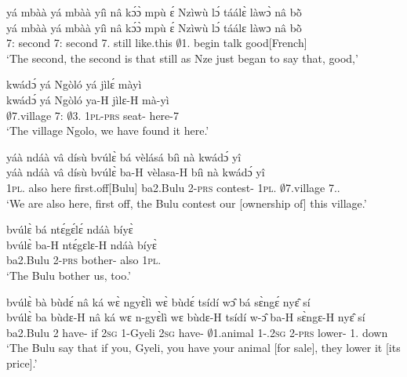 \begin{exe}[(C234)]
\exC\label{102} 
  \glll  yá mbàà yá mbàà yíì nâ kɔ́ɔ̀ mpù ɛ́ Nzìwù lɔ́ táálɛ̀ làwɔ̀ nâ bõ̀ \\
         yá mbàà yá mbàà yíì nâ kɔ́ɔ̀ mpù ɛ́ Nzìwù lɔ́ táálɛ làwɔ nâ bõ̀ \\
         7:{\ATT}  second 7:{\ATT}  second 7.{\COP} {\COMP} still like.this {\LOC} $\emptyset$1.{\PN} {\RETRO}  begin talk {\COMP} good[French]   \\
    \trans `The second, the second is that still as Nze just began to say that, good,'
 
\exC\label{103}
  \glll  kwádɔ́ yá Ngòló yá jìlɛ́ màyì \\
        kwádɔ́ yá Ngòló ya-H jìlɛ-H mà-yì \\
          $\emptyset$7.village 7:{\ATT}  $\emptyset$3.{\PN} 1\textsc{pl}-\textsc{prs} seat-{\R} here-7  \\
    \trans `The village Ngolo, we have found it here.'
 
\exC\label{104}
  \glll  yáà ndáà vâ dísù bvúlɛ̀ bá vèlásá bíì nà kwádɔ́ yî \\
        yáà ndáà vâ dísù bvúlɛ̀ ba-H vèlasa-H bíì nà kwádɔ́ yî \\
          1\textsc{pl}.{\COP} also here first.off[Bulu] ba2.Bulu 2-\textsc{prs} contest-{\R} 1\textsc{pl}.{\OBJ} {\COM} $\emptyset$7.village 7.{\DEM}.{\PROX}  \\
    \trans `We are also here, first off, the Bulu contest our [ownership of] this village.'
 
\exC\label{105} 
  \glll bvúlɛ̀ bá ntɛ́gɛ́lɛ́ ndáà bíyɛ̀ \\
       bvúlɛ̀ ba-H ntɛ́gɛlɛ-H ndáà bíyɛ̀ \\
         ba2.Bulu 2-\textsc{prs} bother-{\R} also 1\textsc{pl}.{\OBJ}   \\
    \trans `The Bulu bother us, too.'
 
\exC\label{106}
  \glll bvúlɛ̀ bà bùdɛ́ nâ ká wɛ̀ ngyɛ̀lì wɛ̀ bùdɛ́ tsídí wɔ̂ bá sɛ̀ngɛ́ nyɛ̂ sí \\
        bvúlɛ̀ ba bùdɛ-H nâ ká wɛ n-gyɛ̀lì wɛ bùdɛ-H tsídí w-ɔ̂ ba-H sɛ̀ngɛ-H nyɛ̂ sí \\
          ba2.Bulu 2 have-{\R} {\COMP} if 2\textsc{sg} {\N}1-Gyeli 2\textsc{sg} have-{\R} $\emptyset$1.animal 1-{\POSS}.2\textsc{sg} 2-\textsc{prs} lower-{\R} 1.{\OBJ} down   \\
    \trans `The Bulu say that if you, Gyeli, you have your animal [for sale], they lower it [its price].'
 

\end{exe}
